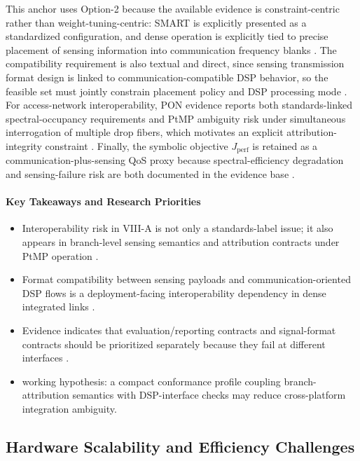 This anchor uses Option-2 because the available evidence is constraint-centric rather than weight-tuning-centric: SMART is explicitly presented as a standardized configuration, and dense operation is explicitly tied to precise placement of sensing information into communication frequency blanks \cite{O_ISAC_220}. The compatibility requirement is also textual and direct, since sensing transmission format design is linked to communication-compatible DSP behavior, so the feasible set must jointly constrain placement policy and DSP processing mode \cite{O_ISAC_220}. For access-network interoperability, PON evidence reports both standards-linked spectral-occupancy requirements and PtMP ambiguity risk under simultaneous interrogation of multiple drop fibers, which motivates an explicit attribution-integrity constraint \cite{O_ISAC_104}. Finally, the symbolic objective $J_{\mathrm{perf}}$ is retained as a communication-plus-sensing QoS proxy because spectral-efficiency degradation and sensing-failure risk are both documented in the evidence base \cite{O_ISAC_220, O_ISAC_104}.

\paragraph{Key Takeaways and Research Priorities}
\begin{itemize}
    \item Interoperability risk in VIII-A is not only a standards-label issue; it also appears in branch-level sensing semantics and attribution contracts under PtMP operation \cite{O_ISAC_104}.
    \item Format compatibility between sensing payloads and communication-oriented DSP flows is a deployment-facing interoperability dependency in dense integrated links \cite{O_ISAC_220}.
    \item Evidence indicates that evaluation/reporting contracts and signal-format contracts should be prioritized separately because they fail at different interfaces \cite{O_ISAC_104, O_ISAC_220}.
    \item working hypothesis: a compact conformance profile coupling branch-attribution semantics with DSP-interface checks may reduce cross-platform integration ambiguity.
\end{itemize}

\subsection{Hardware Scalability and Efficiency Challenges}

